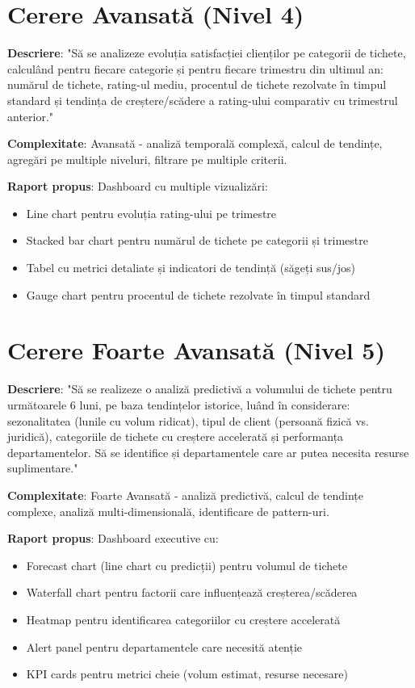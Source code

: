 \section{Cerere Avansată (Nivel 4)}

\textbf{Descriere}: "Să se analizeze evoluția satisfacției clienților pe categorii de tichete, calculând pentru fiecare categorie și pentru fiecare trimestru din ultimul an: numărul de tichete, rating-ul mediu, procentul de tichete rezolvate în timpul standard și tendința de creștere/scădere a rating-ului comparativ cu trimestrul anterior."

\textbf{Complexitate}: Avansată - analiză temporală complexă, calcul de tendințe, agregări pe multiple niveluri, filtrare pe multiple criterii.

\textbf{Raport propus}: Dashboard cu multiple vizualizări:
\begin{itemize}
    \item Line chart pentru evoluția rating-ului pe trimestre
    \item Stacked bar chart pentru numărul de tichete pe categorii și trimestre
    \item Tabel cu metrici detaliate și indicatori de tendință (săgeți sus/jos)
    \item Gauge chart pentru procentul de tichete rezolvate în timpul standard
\end{itemize}

\section{Cerere Foarte Avansată (Nivel 5)}

\textbf{Descriere}: "Să se realizeze o analiză predictivă a volumului de tichete pentru următoarele 6 luni, pe baza tendințelor istorice, luând în considerare: sezonalitatea (lunile cu volum ridicat), tipul de client (persoană fizică vs. juridică), categoriile de tichete cu creștere accelerată și performanța departamentelor. Să se identifice și departamentele care ar putea necesita resurse suplimentare."

\textbf{Complexitate}: Foarte Avansată - analiză predictivă, calcul de tendințe complexe, analiză multi-dimensională, identificare de pattern-uri.

\textbf{Raport propus}: Dashboard executive cu:
\begin{itemize}
    \item Forecast chart (line chart cu predicții) pentru volumul de tichete
    \item Waterfall chart pentru factorii care influențează creșterea/scăderea
    \item Heatmap pentru identificarea categoriilor cu creștere accelerată
    \item Alert panel pentru departamentele care necesită atenție
    \item KPI cards pentru metrici cheie (volum estimat, resurse necesare)
\end{itemize}

